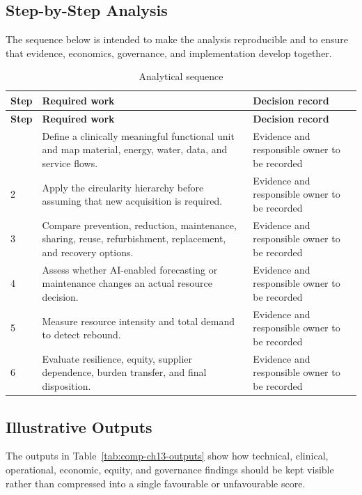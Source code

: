 \subsection{Step-by-Step Analysis}
The sequence below is intended to make the analysis reproducible and to ensure
that evidence, economics, governance, and implementation develop together.

\begin{longtable}{@{}p{}p{}p{}@{}}
\caption{Analytical sequence}
\label{tab:comp-ch13-analysis-steps}\\
\toprule
\textbf{Step} & \textbf{Required work} & \textbf{Decision record} \\
\midrule
\endfirsthead
\toprule
\textbf{Step} & \textbf{Required work} & \textbf{Decision record} \\
\midrule
\endhead
\bottomrule
\endlastfoot
1 & Define a clinically meaningful functional unit and map material, energy, water, data, and service flows. & Evidence and responsible owner to be recorded \\
2 & Apply the circularity hierarchy before assuming that new acquisition is required. & Evidence and responsible owner to be recorded \\
3 & Compare prevention, reduction, maintenance, sharing, reuse, refurbishment, replacement, and recovery options. & Evidence and responsible owner to be recorded \\
4 & Assess whether AI-enabled forecasting or maintenance changes an actual resource decision. & Evidence and responsible owner to be recorded \\
5 & Measure resource intensity and total demand to detect rebound. & Evidence and responsible owner to be recorded \\
6 & Evaluate resilience, equity, supplier dependence, burden transfer, and final disposition. & Evidence and responsible owner to be recorded \\
\end{longtable}

\subsection{Illustrative Outputs}
The outputs in Table~\ref{tab:comp-ch13-outputs} show how technical,
clinical, operational, economic, equity, and governance findings should be kept
visible rather than compressed into a single favourable or unfavourable score.

